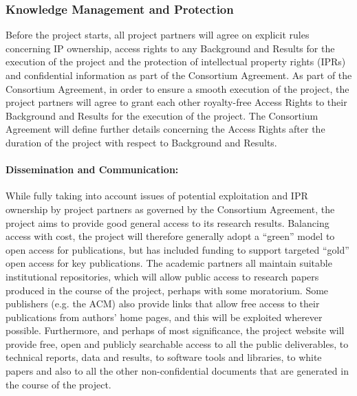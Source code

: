 \documentclass[a4paper,11pt]{article}
\begin{document}
\subsubsection{Knowledge Management and Protection}
\vspace{-12pt}


Before the project starts, all project partners will agree on explicit rules concerning IP ownership, access rights to any
Background and Results for the execution of the project and the
protection of intellectual property rights (IPRs) and confidential
information as part of the Consortium Agreement.
As part of the Consortium Agreement, in order to ensure a smooth
execution of the project, the project partners will agree to grant each other
royalty-free Access Rights to their Background and Results for the
execution of the project. The Consortium Agreement will define further
details concerning the Access Rights after the duration of the project 
with respect to Background and Results.

\paragraph{Dissemination and Communication:}
While fully taking into account issues of potential exploitation and IPR ownership by project partners
as governed by the Consortium Agreement,
the project aims to provide good general access to its research results.
Balancing access with cost, the project will therefore generally adopt a ``green'' model to open access for publications,
but has included funding to support targeted ``gold'' open access for key publications.
The academic partners all maintain suitable institutional repositories, which will allow public access to research papers produced in the
course of the project, perhaps with some moratorium.  Some publishers (e.g. the ACM) also provide links that allow
free access to their publications from authors' home pages, and this will be exploited wherever possible.
%
Furthermore, and perhaps of most significance, the project website will provide free,
open and publicly searchable access to all the public deliverables, to technical reports, data and results, to software tools
and libraries, to white papers and also to all
the other non-confidential documents that are generated in the course of the project.  
\end{document}
